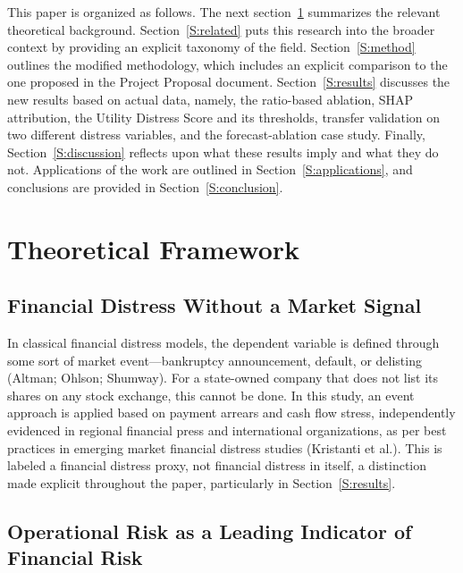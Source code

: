\documentclass[final,1p,times]{elsarticle}
\begin{document}
This paper is organized as follows. The next section~\ref{S:theory} summarizes the relevant theoretical background. Section~\ref{S:related} puts this research into the broader context by providing an explicit taxonomy of the field. Section~\ref{S:method} outlines the modified methodology, which includes an explicit comparison to the one proposed in the Project Proposal document. Section~\ref{S:results} discusses the new results based on actual data, namely, the ratio-based ablation, SHAP attribution, the Utility Distress Score and its thresholds, transfer validation on two different distress variables, and the forecast-ablation case study. Finally, Section~\ref{S:discussion} reflects upon what these results imply and what they do not. Applications of the work are outlined in Section~\ref{S:applications}, and conclusions are provided in Section~\ref{S:conclusion}.

\section{Theoretical Framework}
\label{S:theory}

\subsection{Financial Distress Without a Market Signal}

In classical financial distress models, the dependent variable is defined through some sort of market event—bankruptcy announcement, default, or delisting (Altman; Ohlson; Shumway). For a state-owned company that does not list its shares on any stock exchange, this cannot be done. In this study, an event approach is applied based on payment arrears and cash flow stress, independently evidenced in regional financial press and international organizations, as per best practices in emerging market financial distress studies (Kristanti et al.). This is labeled a financial distress proxy, not financial distress in itself, a distinction made explicit throughout the paper, particularly in Section~\ref{S:results}.

\subsection{Operational Risk as a Leading Indicator of Financial Risk}
\end{document}
